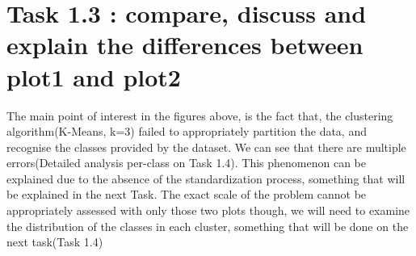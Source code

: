 \documentclass[12pt]{article}
\begin{document}
	 \section*{Task 1.3 : compare, discuss and explain the differences between plot1 and plot2}
		The main point of interest in the figures above, is the fact that, the clustering algorithm(K-Means, k=3) failed to appropriately partition the data, and recognise the classes provided by the dataset. We can see that there are multiple errors(Detailed analysis per-class on Task 1.4). This phenomenon can be explained due to the absence of the standardization process, something that will be explained in the next Task. The exact scale of the problem cannot be appropriately assessed with only those two plots though, we will need to examine the distribution of the classes in each cluster, something that will be done on the next task(Task 1.4)
	
\end{document}
